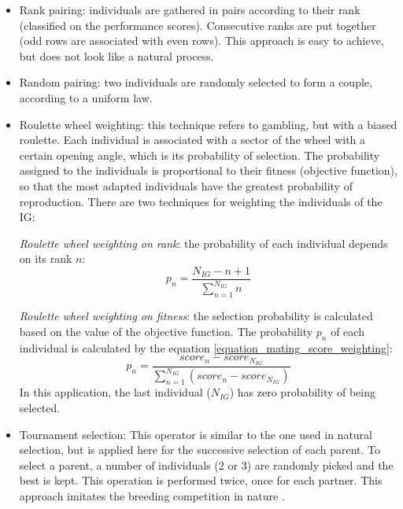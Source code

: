 \documentclass[twocol]{ametsoc}
\begin{document}
\begin{itemize}
	\item Rank pairing: individuals are gathered in pairs according to their rank (classified on the performance scores). Consecutive ranks are put together (odd rows are associated with even rows). This approach is easy to achieve, but does not look like a natural process.
	
	\item Random pairing: two individuals are randomly selected to form a couple, according to a uniform law.
	
	\item Roulette wheel weighting: this technique refers to gambling, but with a biased roulette. Each individual is associated with a sector of the wheel with a certain opening angle, which is its probability of selection. The probability assigned to the individuals is proportional to their fitness (objective function), so that the most adapted individuals have the greatest probability of reproduction. There are two techniques for weighting the individuals of the IG:
	
	\textit{Roulette wheel weighting on rank}: the probability of each individual depends on its rank $n$:
	\begin{equation}
	p_{n}=\dfrac{N_{IG}-n+1}{\sum^{N_{IG}}_{n=1}n}
	\label{equation_mating_rank_weighting}
	\end{equation}
	
	\textit{Roulette wheel weighting on fitness}: the selection probability is calculated based on the value of the objective function. The probability $p_{n}$ of each individual is calculated by the equation \ref{equation_mating_score_weighting}:
	\begin{equation}
	p_{n}=\frac{score_{n}-score_{N_{IG}}}{\sum_{n=1}^{N_{IG}} (score_{n}-score_{N_{IG}})}
	\label{equation_mating_score_weighting}
	\end{equation}
	In this application, the last individual ($N_{IG}$) has zero probability of being selected.
	
	
	\item Tournament selection: This operator is similar to the one used in natural selection, but is applied here for the successive selection of each parent. To select a parent, a number of individuals (2 or 3) are randomly picked and the best is kept. This operation is performed twice, once for each partner. This approach imitates the breeding competition in nature \citep{Haupt2004}.
\end{itemize}
\end{document}
